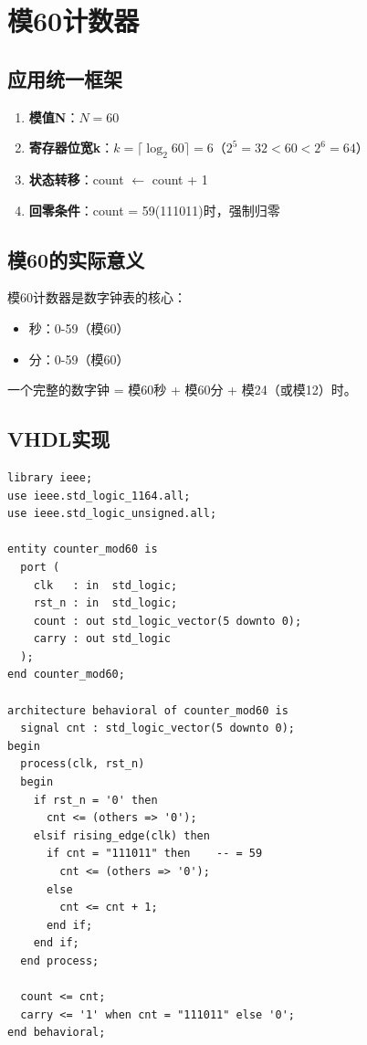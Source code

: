 \chapter{模60计数器}

\section{应用统一框架}

\begin{enumerate}
  \item \textbf{模值N}：$N = 60$
  \item \textbf{寄存器位宽k}：$k = \lceil \log_2 60 \rceil = 6$（$2^5=32<60<2^6=64$）
  \item \textbf{状态转移}：count $\leftarrow$ count + 1
  \item \textbf{回零条件}：count = 59(111011)时，强制归零
\end{enumerate}

\section{模60的实际意义}

模60计数器是数字钟表的核心：
\begin{itemize}
  \item 秒：0-59（模60）
  \item 分：0-59（模60）
\end{itemize}

一个完整的数字钟 = 模60秒 + 模60分 + 模24（或模12）时。

\section{VHDL实现}

\begin{lstlisting}[caption={模60二进制计数器}]
library ieee;
use ieee.std_logic_1164.all;
use ieee.std_logic_unsigned.all;

entity counter_mod60 is
  port (
    clk   : in  std_logic;
    rst_n : in  std_logic;
    count : out std_logic_vector(5 downto 0);
    carry : out std_logic
  );
end counter_mod60;

architecture behavioral of counter_mod60 is
  signal cnt : std_logic_vector(5 downto 0);
begin
  process(clk, rst_n)
  begin
    if rst_n = '0' then
      cnt <= (others => '0');
    elsif rising_edge(clk) then
      if cnt = "111011" then    -- = 59
        cnt <= (others => '0');
      else
        cnt <= cnt + 1;
      end if;
    end if;
  end process;

  count <= cnt;
  carry <= '1' when cnt = "111011" else '0';
end behavioral;
\end{lstlisting}

